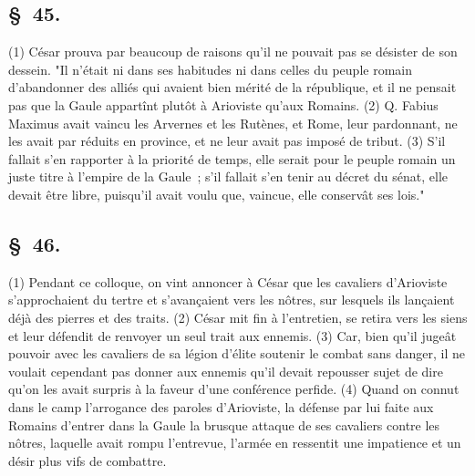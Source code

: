 \documentclass[french,twoside]{book} %
\begin{document}
\subsection[{§ 45.}]{ \textsc{§ 45.} }
\noindent (1) César prouva par beaucoup de raisons qu’il ne pouvait pas se désister de son dessein. "Il n’était ni dans ses habitudes ni dans celles du peuple romain d’abandonner des alliés qui avaient bien mérité de la république, et il ne pensait pas que la Gaule appartînt plutôt à Arioviste qu’aux Romains. (2) Q. Fabius Maximus avait vaincu les Arvernes et les Rutènes, et Rome, leur pardonnant, ne les avait par réduits en province, et ne leur avait pas imposé de tribut. (3) S'il fallait s’en rapporter à la priorité de temps, elle serait pour le peuple romain un juste titre à l’empire de la Gaule ; s’il fallait s’en tenir au décret du sénat, elle devait être libre, puisqu’il avait voulu que, vaincue, elle conservât ses lois."
\subsection[{§ 46.}]{ \textsc{§ 46.} }
\noindent (1) Pendant ce colloque, on vint annoncer à César que les cavaliers d’Arioviste s’approchaient du tertre et s’avançaient vers les nôtres, sur lesquels ils lançaient déjà des pierres et des traits. (2) César mit fin à l’entretien, se retira vers les siens et leur défendit de renvoyer un seul trait aux ennemis. (3) Car, bien qu’il jugeât pouvoir avec les cavaliers de sa légion d’élite soutenir le combat sans danger, il ne voulait cependant pas donner aux ennemis qu’il devait repousser sujet de dire qu’on les avait surpris à la faveur d’une conférence perfide. (4) Quand on connut dans le camp l’arrogance des paroles d’Arioviste, la défense par lui faite aux Romains d’entrer dans la Gaule la brusque attaque de ses cavaliers contre les nôtres, laquelle avait rompu l’entrevue, l’armée en ressentit une impatience et un désir plus vifs de combattre.
\end{document}
